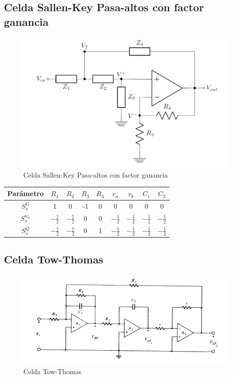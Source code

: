 \documentclass[../tc_tpfinal_main.tex]{subfiles}
\begin{document}
\subsection{Celda Sallen-Key Pasa-altos con factor ganancia}
\begin{figure}[H]	
	\centering
	\includegraphics[scale=0.5]{imagenes/sallen_key_gain_circ.png}
	\caption{Celda Sallen-Key Pasa-altos con factor ganancia}
	\label{fig:tpfinal_sallen_key_gain_circ}
\end{figure}
			 	\begin{table}[H] %
				\centering
 				\begin{tabular}{||c c c c c c c c c||} 
 					\hline
				  Parámetro& $R_1$ & $R_2$ & $R_3$ & $R_4$ & $r_a$ & $r_b$&$C_1$&$C_2$\\ [0.5ex] 
 					\hline\hline
					 $S^G_x$& 1 & 0& -1& 0&0&0&0&0\\
					 $S^{w_0}_x$& $- \frac{1}{2}$ &$- \frac{1}{2}$& 0& 0&$- \frac{1}{2}$&$- \frac{1}{2}$&$- \frac{1}{2}$&$- \frac{1}{2}$\\
					 $S^{Q}_x$&$- \frac{1}{2}$ &$- \frac{1}{2}$& 0& 1&$- \frac{1}{2}$&$- \frac{1}{2}$&$- \frac{1}{2}$&$- \frac{1}{2}$\\[1ex] 
					\hline
				\end{tabular}
			\end{table}
\subsection{Celda Tow-Thomas}

\begin{figure}[H]	
	\centering
	\includegraphics[scale=0.5]{imagenes/tow_thomas_circ.png}
	\caption{Celda Tow-Thomas}
	\label{fig:tpfinal_tow_thomas_circ}
\end{figure}
\end{document}
